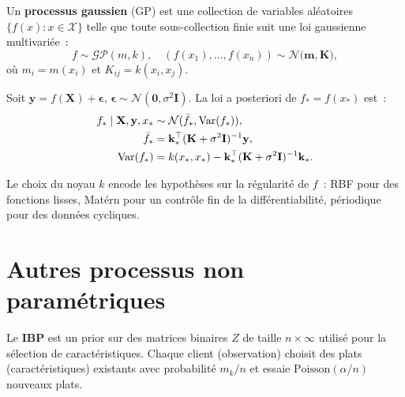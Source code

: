 \begin{definition}
Un \textbf{processus gaussien} (GP) est une collection de variables
al\'eatoires $\{f(x) : x \in \mathcal{X}\}$ telle que toute sous-collection
finie suit une loi gaussienne multivari\'ee~:
\[
  f \sim \mathcal{GP}(m, k), \quad
  (f(x_1), \ldots, f(x_n)) \sim \mathcal{N}\!\bigl(\mathbf{m}, \mathbf{K}\bigr),
\]
o\`u $m_{i} = m(x_i)$ et $K_{ij} = k(x_i, x_j)$.
\end{definition}

\begin{theoreme}
Soit $\mathbf{y} = f(\mathbf{X}) + \boldsymbol{\epsilon}$,
$\boldsymbol{\epsilon} \sim \mathcal{N}(\mathbf{0}, \sigma^2 \mathbf{I})$.
La loi a posteriori de $f_* = f(x_*)$ est~:
\begin{align}
  f_* \mid \mathbf{X}, \mathbf{y}, x_* &\sim \mathcal{N}(\bar{f}_*, \mathrm{Var}(f_*)), \\
  \bar{f}_* &= \mathbf{k}_*^\top (\mathbf{K} + \sigma^2 \mathbf{I})^{-1}\mathbf{y}, \\
  \mathrm{Var}(f_*) &= k(x_*, x_*) - \mathbf{k}_*^\top(\mathbf{K} + \sigma^2 \mathbf{I})^{-1}\mathbf{k}_*.
\end{align}
\end{theoreme}

\begin{remarque}
Le choix du noyau $k$ encode les hypoth\`eses sur la r\'egularit\'e de $f$~:
RBF pour des fonctions lisses, Mat\'ern pour un contr\^ole fin de la
diff\'erentiabilit\'e, p\'eriodique pour des donn\'ees cycliques.
\end{remarque}

\section{Autres processus non param\'etriques}

\begin{definition}
Le \textbf{IBP} est un prior sur des matrices binaires $Z$ de taille
$n \times \infty$ utilis\'e pour la s\'election de caract\'eristiques.
Chaque client (observation) choisit des plats (caract\'eristiques) existants
avec probabilit\'e $m_k / n$ et essaie $\mathrm{Poisson}(\alpha / n)$
nouveaux plats.
\end{definition}

